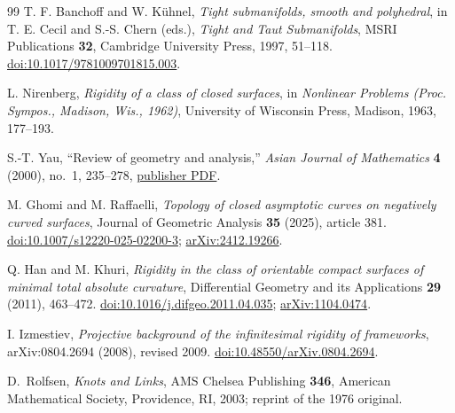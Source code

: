 \documentclass[11pt]{amsart}
\theoremstyle{definition}
\theoremstyle{remark}
\numberwithin{equation}{section}
\begin{document}
\begin{thebibliography}{99}
T. F. Banchoff and W. K\"uhnel,
\emph{Tight submanifolds, smooth and polyhedral}, in T. E. Cecil and S.-S. Chern (eds.), \emph{Tight and Taut Submanifolds}, MSRI Publications \textbf{32}, Cambridge University Press, 1997, 51--118.
\href{https://doi.org/10.1017/9781009701815.003}{doi:10.1017/9781009701815.003}.

L. Nirenberg,
\emph{Rigidity of a class of closed surfaces}, in \emph{Nonlinear Problems (Proc. Sympos., Madison, Wis., 1962)}, University of Wisconsin Press, Madison, 1963, 177--193.

S.-T. Yau, ``Review of geometry and analysis,'' \emph{Asian Journal of
Mathematics} \textbf{4} (2000), no.~1, 235--278,
\href{https://archive.intlpress.com/site/pub/files/_fulltext/journals/ajm/2000/0004/0001/AJM-2000-0004-0001-a016.pdf}{publisher PDF}.

M. Ghomi and M. Raffaelli,
\emph{Topology of closed asymptotic curves on negatively curved surfaces}, Journal of Geometric Analysis \textbf{35} (2025), article 381.
\href{https://doi.org/10.1007/s12220-025-02200-3}{doi:10.1007/s12220-025-02200-3};
\href{https://arxiv.org/abs/2412.19266}{arXiv:2412.19266}.

Q. Han and M. Khuri,
\emph{Rigidity in the class of orientable compact surfaces of minimal total absolute curvature}, Differential Geometry and its Applications \textbf{29} (2011), 463--472.
\href{https://doi.org/10.1016/j.difgeo.2011.04.035}{doi:10.1016/j.difgeo.2011.04.035};
\href{https://arxiv.org/abs/1104.0474}{arXiv:1104.0474}.

I. Izmestiev,
\emph{Projective background of the infinitesimal rigidity of frameworks}, arXiv:0804.2694 (2008), revised 2009.
\href{https://doi.org/10.48550/arXiv.0804.2694}{doi:10.48550/arXiv.0804.2694}.

D.~Rolfsen, \emph{Knots and Links}, AMS Chelsea Publishing \textbf{346}, American Mathematical Society, Providence, RI, 2003; reprint of the 1976 original.
\end{thebibliography}
\end{document}
